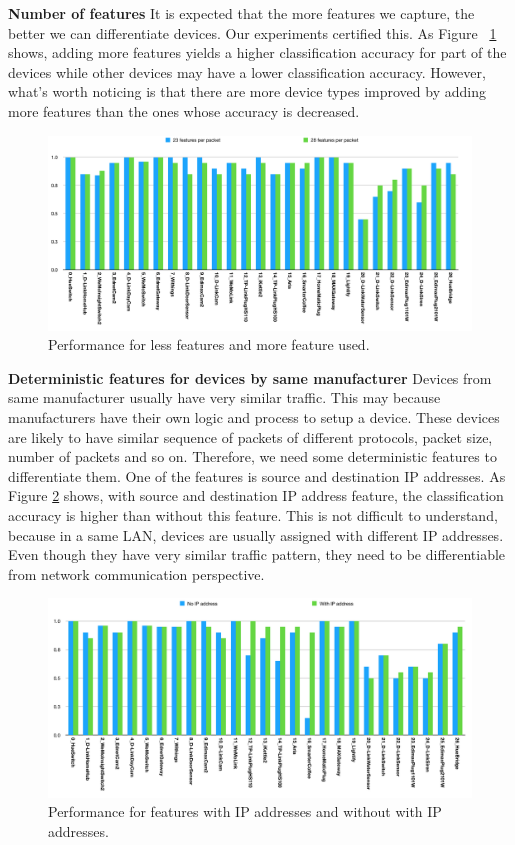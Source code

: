 \documentclass[twocolumn,10pt]{article}
\begin{document}
\textbf{Number of features}
It is expected that the more features we capture, the better we can differentiate devices. Our experiments certified this. As Figure ~\ref{fig: res2} shows, adding more features yields a higher classification accuracy for part of the devices while other devices may have a lower classification accuracy. However, what's worth noticing is that there are more device types improved by adding more features than the ones whose accuracy is decreased.

\begin{figure}[h]
  \centering
   \includegraphics[scale=0.3]{res2}
  \caption{Performance for less features and more feature used.}
  \label{fig: res2}
\end{figure}

\textbf{Deterministic features for devices by same manufacturer}
Devices from same manufacturer usually have very similar traffic. This may because manufacturers have their own logic and process to setup a device. These devices are likely to have similar sequence of packets of different protocols, packet size, number of packets and so on. Therefore, we need some deterministic features to differentiate them. One of the features is source and destination IP addresses. As Figure \ref{fig: res3} shows, with source and destination IP address feature, the classification accuracy is higher than without this feature. This is not difficult to understand, because in a same LAN, devices are usually assigned with different IP addresses. Even though they have very similar traffic pattern, they need to be differentiable from network communication perspective.



\begin{figure}[h]
  \centering
   \includegraphics[scale=0.3]{res3}
  \caption{Performance for features with IP addresses and without with IP addresses.}
  \label{fig: res3}
\end{figure}
\end{document}
